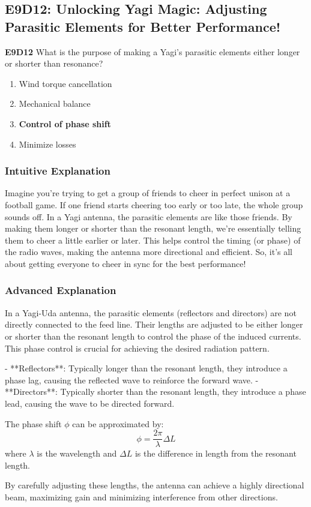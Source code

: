 \subsection{E9D12: Unlocking Yagi Magic: Adjusting Parasitic Elements for Better Performance!}

\begin{tcolorbox}[colback=blue!5!white,colframe=blue!75!black]
    \textbf{E9D12} What is the purpose of making a Yagi’s parasitic elements either longer or shorter than resonance?
    \begin{enumerate}[label=\Alph*)]
        \item Wind torque cancellation
        \item Mechanical balance
        \item \textbf{Control of phase shift}
        \item Minimize losses
    \end{enumerate}
\end{tcolorbox}

\subsubsection{Intuitive Explanation}
Imagine you’re trying to get a group of friends to cheer in perfect unison at a football game. If one friend starts cheering too early or too late, the whole group sounds off. In a Yagi antenna, the parasitic elements are like those friends. By making them longer or shorter than the resonant length, we’re essentially telling them to cheer a little earlier or later. This helps control the timing (or phase) of the radio waves, making the antenna more directional and efficient. So, it’s all about getting everyone to cheer in sync for the best performance!

\subsubsection{Advanced Explanation}
In a Yagi-Uda antenna, the parasitic elements (reflectors and directors) are not directly connected to the feed line. Their lengths are adjusted to be either longer or shorter than the resonant length to control the phase of the induced currents. This phase control is crucial for achieving the desired radiation pattern.

- **Reflectors**: Typically longer than the resonant length, they introduce a phase lag, causing the reflected wave to reinforce the forward wave.
- **Directors**: Typically shorter than the resonant length, they introduce a phase lead, causing the wave to be directed forward.

The phase shift \(\phi\) can be approximated by:
\[
\phi = \frac{2\pi}{\lambda} \Delta L
\]
where \(\lambda\) is the wavelength and \(\Delta L\) is the difference in length from the resonant length.

By carefully adjusting these lengths, the antenna can achieve a highly directional beam, maximizing gain and minimizing interference from other directions.

